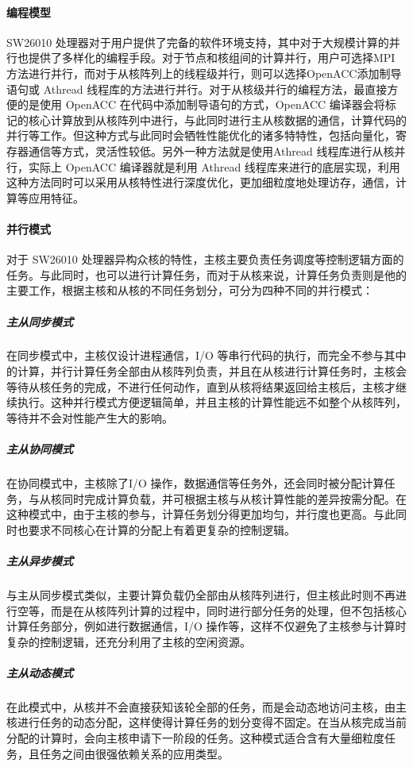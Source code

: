 \paragraph{编程模型}
SW26010 处理器对于用户提供了完备的软件环境支持，其中对于大规模计算的并行也提供了多样化的编程手段。对于节点和核组间的计算并行，用户可选择MPI 方法进行并行，而对于从核阵列上的线程级并行，则可以选择OpenACC添加制导语句或 Athread 线程库的方法进行并行。对于从核级并行的编程方法，最直接方便的是使用 OpenACC 在代码中添加制导语句的方式，OpenACC 编译器会将标记的核心计算放到从核阵列中进行，与此同时进行主从核数据的通信，计算代码的并行等工作。但这种方式与此同时会牺牲性能优化的诸多特特性，包括向量化，寄存器通信等方式，灵活性较低。另外一种方法就是使用Athread 线程库进行从核并行，实际上 OpenACC 编译器就是利用 Athread 线程库来进行的底层实现，利用这种方法同时可以采用从核特性进行深度优化，更加细粒度地处理访存，通信，计算等应用特征。

\paragraph{并行模式}
对于 SW26010 处理器异构众核的特性，主核主要负责任务调度等控制逻辑方面的任务。与此同时，也可以进行计算任务，而对于从核来说，计算任务负责则是他的主要工作，根据主核和从核的不同任务划分，可分为四种不同的并行模式：
\subparagraph{主从同步模式}
在同步模式中，主核仅设计进程通信，I/O 等串行代码的执行，而完全不参与其中的计算，并行计算任务全部由从核阵列负责，并且在从核进行计算任务时，主核会等待从核任务的完成，不进行任何动作，直到从核将结果返回给主核后，主核才继续执行。这种并行模式方便逻辑简单，并且主核的计算性能远不如整个从核阵列，等待并不会对性能产生大的影响。

\subparagraph{主从协同模式}
在协同模式中，主核除了I/O 操作，数据通信等任务外，还会同时被分配计算任务，与从核同时完成计算负载，并可根据主核与从核计算性能的差异按需分配。在这种模式中，由于主核的参与，计算任务划分得更加均匀，并行度也更高。与此同时也要求不同核心在计算的分配上有着更复杂的控制逻辑。

\subparagraph{主从异步模式}
与主从同步模式类似，主要计算负载仍全部由从核阵列进行，但主核此时则不再进行空等，而是在从核阵列计算的过程中，同时进行部分任务的处理，但不包括核心计算任务部分，例如进行数据通信，I/O 操作等，这样不仅避免了主核参与计算时复杂的控制逻辑，还充分利用了主核的空闲资源。

\subparagraph{主从动态模式}
在此模式中，从核并不会直接获知该轮全部的任务，而是会动态地访问主核，由主核进行任务的动态分配，这样使得计算任务的划分变得不固定。在当从核完成当前分配的计算时，会向主核申请下一阶段的任务。这种模式适合含有大量细粒度任务，且任务之间由很强依赖关系的应用类型。

